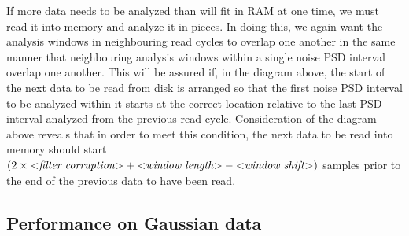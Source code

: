 If more data needs to be analyzed than will fit in RAM at one time, we must
read it into memory and analyze it in pieces.  In doing this, we again want
the analysis windows in neighbouring read cycles to overlap one another in
the same manner that neighbouring analysis windows within a single noise
PSD interval overlap one another.  This will be assured if, in the diagram
above, the start of the next data to be read from disk is arranged so that
the first noise PSD interval to be analyzed within it starts at the correct
location relative to the last PSD interval analyzed from the previous read
cycle.  Consideration of the diagram above reveals that in order to meet
this condition, the next data to be read into memory should start $(2
\times \mbox{$<$\textit{filter corruption}$>$} + \mbox{$<$\textit{window length}$>$} -
\mbox{$<$\textit{window shift}$>$})$ samples prior to the end of the previous data
to have been read.

\subsection{Performance on Gaussian data}
\label{section:Gaussian}

